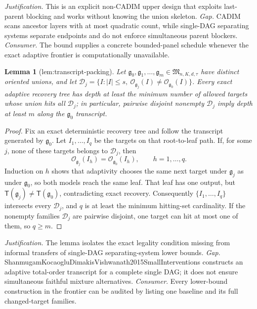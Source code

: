 \documentclass{article}
\newtheorem{lemma}{Lemma}
\begin{document}
\par\smallskip\noindent \textit{Justification.} This is an explicit non-CADIM upper design that exploits last-parent blocking and works without knowing the union skeleton. \textit{Gap.} CADIM scans ancestor layers with at most quadratic count, while single-DAG separating systems separate endpoints and do not enforce simultaneous parent blockers. \textit{Consumer.} The bound supplies a concrete bounded-panel schedule whenever the exact adaptive frontier is computationally unavailable.

\begin{lemma}[lem:transcript-packing]\label{lem:transcript-packing}
Let \(\mathfrak g_0,\mathfrak g_1,\ldots,\mathfrak g_m\in\mathfrak M_{n,K,d,\tau}\) have distinct oriented unions, and let \(\mathscr D_j=\{I:|I|\le s,\ \mathcal O_{\mathfrak g_j}(I)\ne\mathcal O_{\mathfrak g_0}(I)\}\). Every exact adaptive recovery tree has depth at least the minimum number of allowed targets whose union hits all \(\mathscr D_j\); in particular, pairwise disjoint nonempty \(\mathscr D_j\) imply depth at least \(m\) along the \(\mathfrak g_0\) transcript.
\end{lemma}
\begin{proof}
Fix an exact deterministic recovery tree and follow the transcript generated by \(\mathfrak g_0\). Let \(I_1,\ldots,I_q\) be the targets on that root-to-leaf path. If, for some \(j\), none of these targets belongs to \(\mathscr D_j\), then
\[
 \mathcal O_{\mathfrak g_j}(I_h)=\mathcal O_{\mathfrak g_0}(I_h),
 \qquad h=1,\ldots,q.
\]
Induction on \(h\) shows that adaptivity chooses the same next target under \(\mathfrak g_j\) as under \(\mathfrak g_0\), so both models reach the same leaf. That leaf has one output, but \(\mathsf T(\mathfrak g_j)\ne\mathsf T(\mathfrak g_0)\), contradicting exact recovery. Consequently \(\{I_1,\ldots,I_q\}\) intersects every \(\mathscr D_j\), and \(q\) is at least the minimum hitting-set cardinality. If the nonempty families \(\mathscr D_j\) are pairwise disjoint, one target can hit at most one of them, so \(q\ge m\).
\end{proof}
\par\smallskip\noindent \textit{Justification.} The lemma isolates the exact legality condition missing from informal transfers of single-DAG separating-system lower bounds. \textit{Gap.} ShanmugamKocaogluDimakisVishwanath2015SmallInterventions constructs an adaptive total-order transcript for a complete single DAG; it does not ensure simultaneous faithful mixture alternatives. \textit{Consumer.} Every lower-bound construction in the frontier can be audited by listing one baseline and its full changed-target families.
\end{document}
